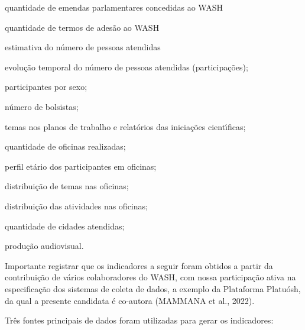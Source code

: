 \documentclass[
12pt,		%
openright,	%
twoside,  %
a4paper,			%
chapter=TITLE,		%
english,			%
french,				%
spanish,			%
brazil				%
]{USPSC-classe/USPSC}
\begin{document}
\begin{alineas}
\item quantidade de emendas parlamentares concedidas ao WASH
\item quantidade de termos de ades\~ao ao WASH
\item estimativa do n\'umero de pessoas atendidas
\item evolu\c{c}\~ao temporal do n\'umero de pessoas atendidas (participa\c{c}\~oes);
\item participantes por sexo;
\item n\'umero de bolsistas;
\item temas nos planos de trabalho e relat\'orios das inicia\c{c}\~oes cient\'{\i}ficas;
\item quantidade de oficinas realizadas;
\item perfil et\'ario dos participantes em oficinas;
\item distribui\c{c}\~ao de temas nas oficinas;
\item distribui\c{c}\~ao das atividades nas oficinas;
\item quantidade de cidades atendidas;
\item produ\c{c}\~ao audiovisual.
\end{alineas}

Importante registrar que os indicadores a seguir foram obtidos a partir da contribui\c{c}\~ao de v\'arios colaboradores do WASH, com nossa participa\c{c}\~ao ativa na especifica\c{c}\~ao dos sistemas de coleta de dados, a exemplo da Plataforma Platu\'osh, da qual a presente candidata \'e co-autora  (MAMMANA et al., 2022).

















Tr\^es fontes principais de dados foram utilizadas para gerar os indicadores:
\end{document}
